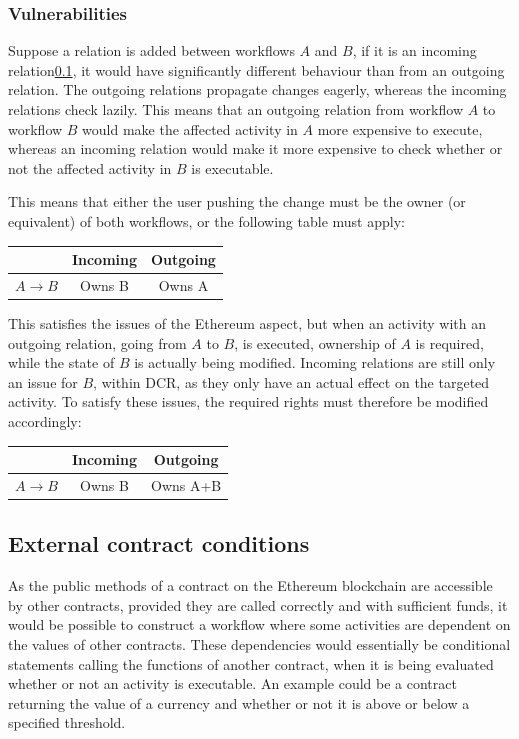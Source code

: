 \documentclass{article}
\begin{document}
			\subsubsection{Vulnerabilities}

			Suppose a relation is added between workflows $A$ and $B$, if it is an incoming relation\ref{}, it would have significantly different behaviour than from an outgoing relation.
			The outgoing relations propagate changes eagerly, whereas the incoming relations check lazily.
			This means that an outgoing relation from workflow $A$ to workflow $B$ would make the affected activity in $A$ more expensive to execute, whereas an incoming relation would make it more expensive to check whether or not the affected activity in $B$ is executable. 

			This means that either the user pushing the change must be the owner (or equivalent) of both workflows, or the following table must apply:
			\begin{table}[!ht]
				\begin{tabular}{|c|c|c|}
				\hline
				 					& Incoming 	& Outgoing \\ \hline
				$A \rightarrow B$ 	& Owns B    & Owns A \\
				\hline
				\end{tabular}
			\end{table}

			This satisfies the issues of the Ethereum aspect, but when an activity with an outgoing relation, going from $A$ to $B$, is executed, ownership of $A$ is required, while the state of $B$ is actually being modified.
			Incoming relations are still only an issue for $B$, within DCR, as they only have an actual effect on the targeted activity.
			To satisfy these issues, the required rights must therefore be modified accordingly:
			\begin{table}[!ht]
				\begin{tabular}{|c|c|c|}
				\hline
				 					& Incoming 	& Outgoing \\ \hline
				$A \rightarrow B$ 	& Owns B    & Owns A+B \\
				\hline
				\end{tabular}
			\end{table}

		\subsection{External contract conditions}
		As the public methods of a contract on the Ethereum blockchain are accessible by other contracts, provided they are called correctly and with sufficient funds, it would be possible to construct a workflow where some activities are dependent on the values of other contracts.
		These dependencies would essentially be conditional statements calling the functions of another contract, when it is being evaluated whether or not an activity is executable. 
		An example could be a contract returning the value of a currency and whether or not it is above or below a specified threshold.
\end{document}
